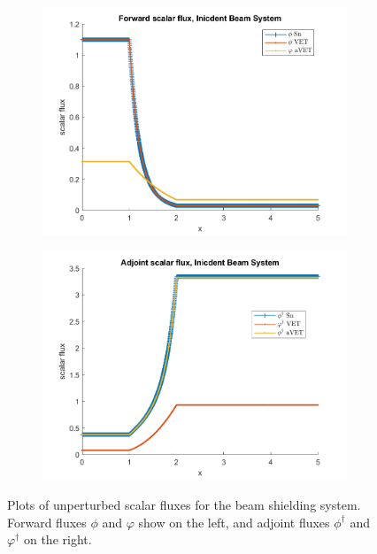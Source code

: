 \documentclass[12pt]{report}
\begin{document}
\begin{figure}[H]
\centering
\begin{subfigure}{.5\textwidth}
  \centering
  \includegraphics[width=.98\linewidth]{figures2/25phi.png}
\end{subfigure}%
\begin{subfigure}{.5\textwidth}
  \centering
  \includegraphics[width=.98\linewidth]{figures2/25phia.png}
\end{subfigure}
\caption{Plots of unperturbed scalar fluxes for the beam shielding system. Forward fluxes $\phi$ and $\varphi$ show on the left, and adjoint fluxes $\phi^\dag$ and $\varphi^\dag$ on the right.}
\label{Flux31}
\end{figure}
\end{document}
